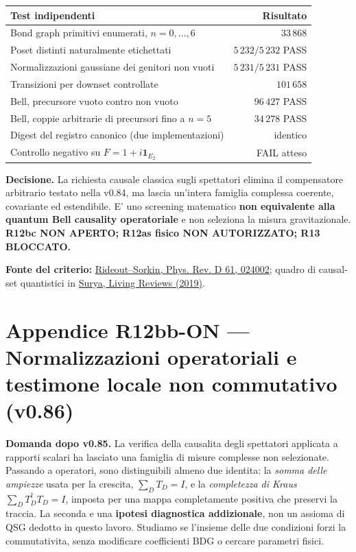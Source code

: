 \documentclass[11pt,a4paper]{article}
\begin{document}
\begin{center}\small
\begin{tabular}{p{10.1cm}r}
\toprule
Test indipendenti & Risultato\\
\midrule
Bond graph primitivi enumerati, $n=0,\ldots,6$ & $33\,868$\\
Poset distinti naturalmente etichettati & $5\,232/5\,232$ PASS\\
Normalizzazioni gaussiane dei genitori non vuoti & $5\,231/5\,231$ PASS\\
Transizioni per downset controllate & $101\,658$\\
Bell, precursore vuoto contro non vuoto & $96\,427$ PASS\\
Bell, coppie arbitrarie di precursori fino a $n=5$ & $34\,278$ PASS\\
Digest del registro canonico (due implementazioni) & identico\\
Controllo negativo su $F=1+i\mathbf1_{E_2}$ & FAIL atteso\\
\bottomrule
\end{tabular}
\end{center}
\textbf{Decisione.} La richiesta causale classica sugli spettatori elimina il compensatore arbitrario testato nella v0.84, ma lascia un'intera famiglia complessa coerente, covariante ed estendibile. E' uno screening matematico \textbf{non equivalente alla quantum Bell causality operatoriale} e non seleziona la misura gravitazionale. \textbf{R12bc NON APERTO; R12as fisico NON AUTORIZZATO; R13 BLOCCATO.}

\textbf{Fonte del criterio:} \href{https://doi.org/10.1103/PhysRevD.61.024002}{Rideout--Sorkin, Phys. Rev. D 61, 024002}; quadro di causal-set quantistici in \href{https://doi.org/10.1007/s41114-019-0023-1}{Surya, Living Reviews (2019)}.

\clearpage
\section*{Appendice R12bb-ON --- Normalizzazioni operatoriali e testimone locale non commutativo (v0.86)}
\textbf{Domanda dopo v0.85.} La verifica della causalita degli spettatori applicata a rapporti scalari ha lasciato una famiglia di misure complesse non selezionate. Passando a operatori, sono distinguibili almeno due identita: la \emph{somma delle ampiezze} usata per la crescita, $\sum_D T_D=I$, e la \emph{completezza di Kraus} $\sum_D T_D^\dagger T_D=I$, imposta per una mappa completamente positiva che preservi la traccia. La seconda e una \textbf{ipotesi diagnostica addizionale}, non un assioma di QSG dedotto in questo lavoro. Studiamo se l'insieme delle due condizioni forzi la commutativita, senza modificare coefficienti BDG o cercare parametri fisici.
\end{document}
